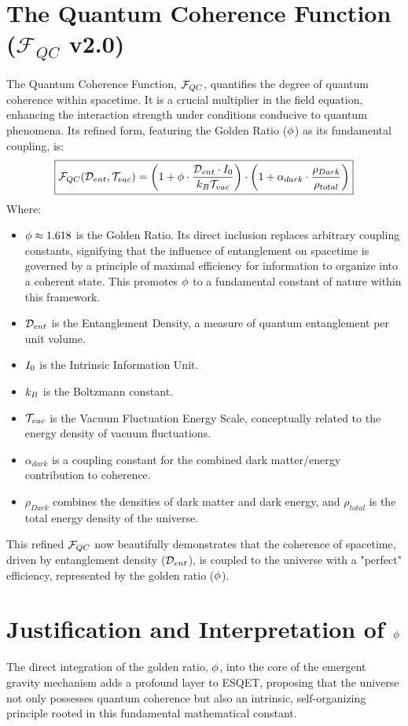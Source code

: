 \section{The Quantum Coherence Function ($\mathcal{F}_{QC}$ v2.0)}
The Quantum Coherence Function, $\mathcal{F}_{QC}$, quantifies the degree of quantum coherence within spacetime. It is a crucial multiplier in the field equation, enhancing the interaction strength under conditions conducive to quantum phenomena. Its refined form, featuring the Golden Ratio ($\phi$) as its fundamental coupling, is:
\begin{align}
    \boxed{\mathcal{F}_{QC}(\mathcal{D}_{ent}, \mathcal{T}_{vac}) = \left( 1 + \phi \cdot \frac{\mathcal{D}_{ent} \cdot I_0}{k_B \mathcal{T}_{vac}} \right) \cdot \left( 1 + \alpha_{dark} \cdot \frac{\rho_{Dark}}{\rho_{total}} \right)}
    \label{eq:fqc_function}
\end{align}
Where:
\begin{itemize}[noitemsep]
    \item $\phi \approx 1.618$ is the Golden Ratio. Its direct inclusion replaces arbitrary coupling constants, signifying that the influence of entanglement on spacetime is governed by a principle of maximal efficiency for information to organize into a coherent state. This promotes $\phi$ to a fundamental constant of nature within this framework.
    \item $\mathcal{D}_{ent}$ is the Entanglement Density, a measure of quantum entanglement per unit volume.
    \item $I_0$ is the Intrinsic Information Unit.
    \item $k_B$ is the Boltzmann constant.
    \item $\mathcal{T}_{vac}$ is the Vacuum Fluctuation Energy Scale, conceptually related to the energy density of vacuum fluctuations.
    \item $\alpha_{dark}$ is a coupling constant for the combined dark matter/energy contribution to coherence.
    \item $\rho_{Dark}$ combines the densities of dark matter and dark energy, and $\rho_{total}$ is the total energy density of the universe.
\end{itemize}
This refined $\mathcal{F}_{QC}$ now beautifully demonstrates that the coherence of spacetime, driven by entanglement density ($\mathcal{D}_{ent}$), is coupled to the universe with a "perfect" efficiency, represented by the golden ratio ($\phi$).

\section{Justification and Interpretation of $\phi$}
The direct integration of the golden ratio, $\phi$, into the core of the emergent gravity mechanism adds a profound layer to ESQET, proposing that the universe not only possesses quantum coherence but also an intrinsic, self-organizing principle rooted in this fundamental mathematical constant.

